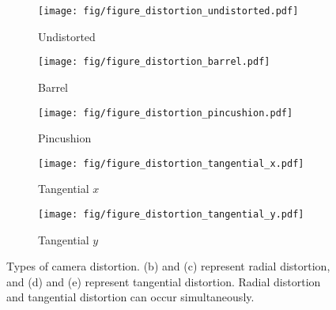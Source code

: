         \begin{figure}[t]
        	\begin{center}
        		\captionsetup{justification=centering}
        		\begin{subfigure}[t]{0.23\linewidth}
        			\centering
        			\texttt{[image: fig/figure\_distortion\_undistorted.pdf]}
        			\vspace{-6mm}
        			\caption{\footnotesize Undistorted}
        		\end{subfigure}
        		\begin{subfigure}[t]{0.23\linewidth}
        			\centering
        			\texttt{[image: fig/figure\_distortion\_barrel.pdf]}
        			\vspace{-6mm}
        			\caption{\footnotesize Barrel}
        		\end{subfigure}
        		\begin{subfigure}[t]{0.23\linewidth}
        			\centering
        			\texttt{[image: fig/figure\_distortion\_pincushion.pdf]}
        			\vspace{-6mm}
        			\caption{\footnotesize Pincushion}
        		\end{subfigure}
    
        		\begin{subfigure}[t]{0.23\linewidth}
        			\centering
        			\texttt{[image: fig/figure\_distortion\_tangential\_x.pdf]}
        			\vspace{-6mm}
        			\caption{\footnotesize Tangential $x$}
        		\end{subfigure}
        		\begin{subfigure}[t]{0.23\linewidth}
        			\centering
        			\texttt{[image: fig/figure\_distortion\_tangential\_y.pdf]}
        			\vspace{-6mm}
        			\caption{\footnotesize Tangential $y$}
        		\end{subfigure}
        	\end{center}
        	    \vspace{-4mm}
        		\caption{Types of camera distortion. (b) and (c) represent radial distortion, and (d) and (e) represent tangential distortion. Radial distortion and tangential distortion can occur simultaneously.}
        		\vspace{-4mm}
        	\label{fig:camera distortion}
        \end{figure}
        \vspace{-2mm}

